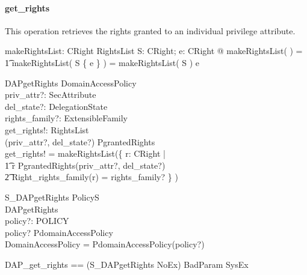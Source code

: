 \paragraph{get\_rights}
This operation retrieves the rights granted to an individual privilege attribute.
\begin{axdef}
  makeRightsList: \power CRight \fun RightsList
  \where
  \forall S: \power CRight; e: CRight @ makeRightsList( \emptyset ) = \langle
  \rangle \land \\ 
  \t1 makeRightsList( S \cup \{ e \} ) = makeRightsList( S ) \cat \langle e
  \rangle \\ 
\end{axdef}
\begin{schema}{DAPgetRights}
  \Xi DomainAccessPolicy \\
  priv\_attr?: SecAttribute \\
  del\_state?: DelegationState \\
  rights\_family?: ExtensibleFamily \\
  get\_rights!: RightsList \\
  \where 
  (priv\_attr?, del\_state?) \in \dom PgrantedRights \\
  get\_rights! = makeRightsList(\{ r: CRight | \\
  \t1 r \in PgrantedRights(priv\_attr?, del\_state?) \\
  \t2 \land Right\_rights\_family(r) = rights\_family? \} ) \\
\end{schema}
\begin{schema}{S\_DAPgetRights}
  \Xi PolicyS \\
  DAPgetRights \\
  policy?: POLICY \\
  \where  
  policy? \in \dom PdomainAccessPolicy \\
  \theta DomainAccessPolicy = PdomainAccessPolicy(policy?) \\ 
\end{schema}
\begin{zed}
  DAP\_get\_rights == (S\_DAPgetRights \land NoEx) \lor BadParam \lor SysEx \\
\end{zed}


